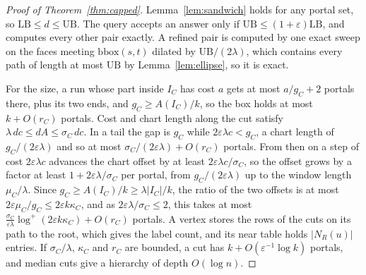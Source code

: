\documentclass[sigconf,nonacm,screen]{acmart}
\newcommand{\LB}{\mathrm{LB}}
\newcommand{\UB}{\mathrm{UB}}
\newcommand{\eps}{\varepsilon}
\begin{document}
\begin{proof}[Proof of Theorem~\ref{thm:capped}]
Lemma~\ref{lem:sandwich} holds for any portal set, so $\LB\le d\le\UB$. The query accepts an answer only if
$\UB\le(1+\eps)\LB$, and computes every other pair exactly. A refined
pair is computed by one exact sweep on the faces meeting $\mathrm{bbox}(s,t)$ dilated by $\UB/(2\lambda)$, which
contains every path of length at most $\UB$ by Lemma~\ref{lem:ellipse}, so it is exact.

For the size, a run whose part inside $I_C$ has cost $a$ gets at most $a/g_C+2$ portals there, plus its two ends,
and $g_C\ge A(I_C)/k$, so the box holds at most $k+O(r_C)$ portals. Cost and chart length along the cut satisfy
$\lambda\,dc\le dA\le\sigma_C\,dc$. In a tail the gap is $g_C$ while $2\eps\lambda c<g_C$, a chart length of
$g_C/(2\eps\lambda)$ and so at most $\sigma_C/(2\eps\lambda)+O(r_C)$ portals. From then on a step of cost $2\eps\lambda c$
advances the chart offset by at least $2\eps\lambda c/\sigma_C$, so the offset grows by a factor at least
$1+2\eps\lambda/\sigma_C$ per portal, from $g_C/(2\eps\lambda)$ up to the window length $\mu_C/\lambda$. Since
$g_C\ge A(I_C)/k\ge\lambda|I_C|/k$, the ratio of the two offsets is at most $2\eps\mu_C/g_C\le2\eps k\kappa_C$, and as
$2\eps\lambda/\sigma_C\le2$, this takes at most $\frac{\sigma_C}{\eps\lambda}\log^+(2\eps k\kappa_C)+O(r_C)$ portals.
A vertex stores the rows of the cuts on its path to the root, which gives the label count, and its near table
holds $|N_R(u)|$ entries. If $\sigma_C/\lambda$, $\kappa_C$ and $r_C$ are bounded, a cut has $k+O(\eps^{-1}\log k)$
portals, and median cuts give a hierarchy of depth $O(\log n)$.
\end{proof}
\end{document}

